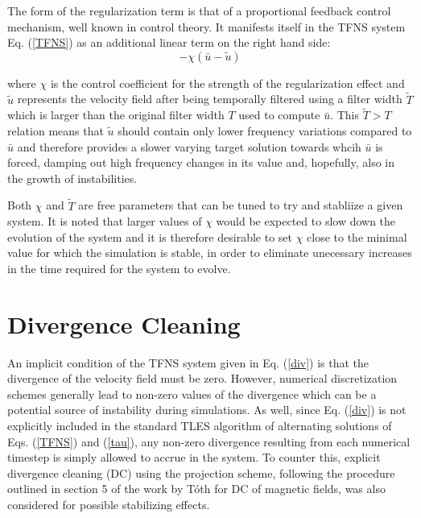 The form of the regularization term is that of a proportional feedback control mechanism, well known in control theory. It manifests itself in the TFNS system Eq. (\ref{TFNS}) as an additional linear term on the right hand side:
\begin{equation} \label{eq:reg}
-\chi(\bar{u}-\tilde{u})
\end{equation}

where $\chi$ is the control coefficient for the strength of the regularization effect and $\tilde{u}$ represents the velocity field after being temporally filtered using a filter width $\tilde{T}$ which is larger than the original filter width $T$ used to compute $\bar{u}$. This $\tilde{T}>T$ relation means that $\tilde{u}$ should contain only lower frequency variations compared to $\bar{u}$ and therefore provides a slower varying target solution towards whcih $\bar{u}$ is forced, damping out high frequency changes in its value and, hopefully, also in the growth of instabilities.

Both $\chi$ and $\tilde{T}$ are free parameters that can be tuned to try and stabliize a given system. It is noted that larger values of $\chi$ would be expected to slow down the evolution of the system and it is therefore desirable to set $\chi$ close to the minimal value for which the simulation is stable, in order to eliminate unecessary increases in the time required for the system to evolve.

\section{Divergence Cleaning} \label{sec:DC}

An implicit condition of the TFNS system given in Eq. (\ref{div}) is that the divergence of the velocity field must be zero. However, numerical discretization schemes generally lead to non-zero values of the divergence which can be a potential source of instability during simulations. As well, since Eq. (\ref{div}) is not explicitly included in the standard TLES algorithm of alternating solutions of Eqs. (\ref{TFNS}) and (\ref{tau}), any non-zero divergence resulting from each numerical timestep is simply allowed to accrue in the system. To counter this, explicit divergence cleaning (DC) using the projection scheme, following the procedure outlined in section 5 of the work by T\'oth \cite{Toth2000} for DC of magnetic fields, was also considered for possible stabilizing effects.

